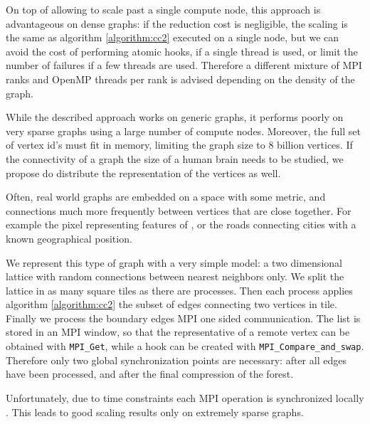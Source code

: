 On top of allowing to scale past a single compute node, this approach is advantageous on
dense graphs: if the reduction cost is negligible, the scaling is the same as algorithm
\ref{algorithm:cc2} executed on a single node,
but we can avoid the cost of performing atomic hooks, if a single thread is used, or limit the
number of failures if a few threads are used.
Therefore a different mixture of MPI ranks and OpenMP threads per rank is advised depending on the
density of the graph.

While the described approach works on generic graphs, it performs poorly on very sparse graphs using
a large number of compute nodes. Moreover, the full set of vertex id's must fit in memory, limiting
the
graph size to $8$ billion vertices. If the connectivity of a graph the size of a human brain needs
to be studied,
we propose do distribute the representation of the vertices as well.

Often, real world graphs are embedded on a space with some metric, and connections  much
more frequently between
vertices that are close together. For example the pixel representing features of , or the
roads connecting cities
with a known geographical position.

We represent this type of graph with a very simple model: a two dimensional lattice with random
connections between nearest neighbors
only. We split the lattice in as many square tiles as there are processes. Then each process
applies algorithm \ref{algorithm:cc2}  the subset
of edges connecting two vertices in  tile. Finally we process the boundary edges  MPI
one sided communication. The list  is stored in an MPI window, so that
the representative of a remote vertex
can be obtained with \verb|MPI_Get|, while a hook can be created with \verb|MPI_Compare_and_swap|.
Therefore only two global synchronization points are necessary: after all edges have been
processed, and after the final compression
of the forest.

Unfortunately, due to time constraints  each MPI operation is
synchronized locally .
This leads to good scaling results only on extremely sparse graphs. %

